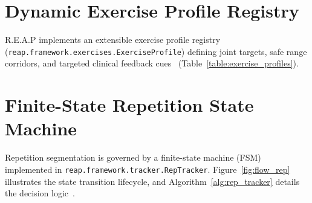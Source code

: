 \documentclass[12pt]{report}
\begin{document}
\section{Dynamic Exercise Profile Registry}
R.E.A.P implements an extensible exercise profile registry (\texttt{reap.framework.}\allowbreak\texttt{exercises.}\allowbreak\texttt{ExerciseProfile}) defining joint targets, safe range corridors, and targeted clinical feedback cues~\cite{escamilla2001knee, fry2003effect} (Table~\ref{table:exercise_profiles}).

\begin{table}[htbp]
    \centering
    \caption{Exercise Biomechanical Profiles}
    \label{table:exercise_profiles}
    \footnotesize
\end{table}

\section{Finite-State Repetition State Machine}
Repetition segmentation is governed by a finite-state machine (FSM) implemented in \texttt{reap.framework.}\allowbreak\texttt{tracker.}\allowbreak\texttt{RepTracker}. Figure~\ref{fig:flow_rep} illustrates the state transition lifecycle, and Algorithm~\ref{alg:rep_tracker} details the decision logic~\cite{sanchez2011velocity}.
\end{document}
